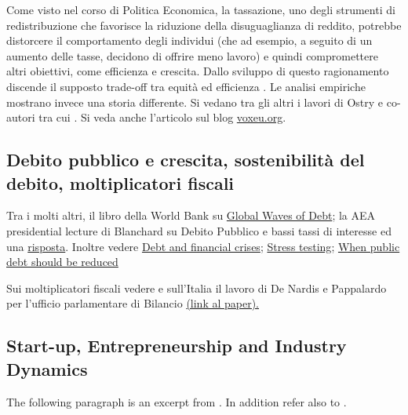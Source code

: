 \documentclass[12pt]{article}
\begin{document}
Come visto nel corso di Politica Economica, la tassazione, uno degli
strumenti di redistribuzione che favorisce la riduzione della
disuguaglianza di reddito, potrebbe distorcere il comportamento degli
individui (che ad esempio, a seguito di un aumento delle tasse,
decidono di offrire meno lavoro) e quindi compromettere altri
obiettivi, come efficienza e crescita. Dallo sviluppo di questo
ragionamento discende il supposto trade-off tra equit\`a ed efficienza
\cite{okun_1975}. Le analisi empiriche mostrano invece una storia
differente. Si vedano tra gli altri i lavori di Ostry e co-autori tra
cui \cite{ostry_etal_2014_redistribution, berg_etal_2018_JEG,
  ostry_etal_2019_confronting}. Si veda anche l'articolo sul blog
\href{https://voxeu.org/article/redistribution-inequality-and-sustainable-growth}{voxeu.org}.







\subsection{Debito pubblico e crescita, sostenibilit\`a del debito, moltiplicatori fiscali}\label{sec:public-debt}

Tra i molti altri, il libro della World Bank su
\href{https://www.worldbank.org/en/research/publication/waves-of-debt}{Global
  Waves of Debt}; la AEA presidential lecture di Blanchard su Debito
Pubblico e bassi tassi di interesse \citep{blanchard_2019} ed una
\href{https://voxeu.org/content/olivier-wonderland}{risposta}. Inoltre vedere
\href{https://voxeu.org/article/debt-and-financial-crises-will-history-repeat-itself}{Debt
  and financial crises};
\href{https://voxeu.org/article/stress-testing-eu-fiscal-framework}{Stress
  testing}; \href{
  https://www.imf.org/external/pubs/ft/sdn/2015/sdn1510.pdf}{When
  public debt should be reduced}

Sui moltiplicatori fiscali vedere \cite{spilimbergo_etal_2009_fiscal}   e sull'Italia il lavoro di De Nardis e Pappalardo per l'ufficio parlamentare di Bilancio \href{http://www.upbilancio.it/nota-di-lavoro-12018/}{(link al paper).}


\subsection{Start-up, Entrepreneurship and Industry Dynamics}\label{sec:start-up}

The following paragraph is an excerpt from
\cite{grazzi_moschella_2018}. In addition refer also to
\cite{santarelli_vivarelli_2007, vivarelli_2013_ICC}. \vspace{0.5cm}
\end{document}
